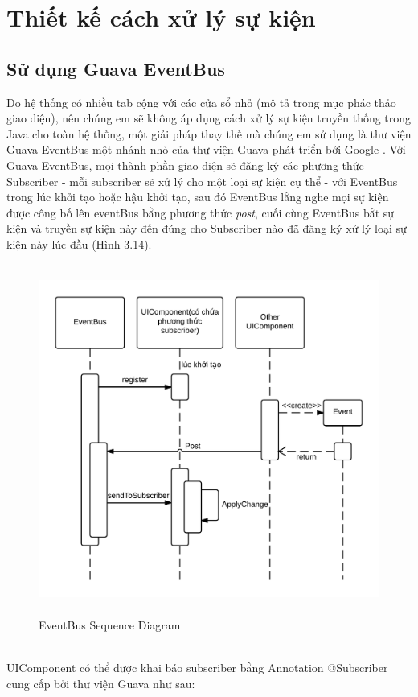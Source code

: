 {\section{Thiết kế cách xử lý sự kiện}
\subsection{Sử dụng Guava EventBus}
Do hệ thống có nhiều tab cộng với các cửa sổ nhỏ (mô tả trong mục phác thảo giao diện), nên chúng em sẽ không áp dụng cách xử lý sự kiện truyền thống trong Java cho toàn hệ thống, một giải pháp thay thế mà chúng em sử dụng là thư viện Guava EventBus một nhánh nhỏ của thư viện Guava phát triển bởi Google \cite{guava}. Với Guava EventBus, mọi thành phần giao diện sẽ đăng ký các phương thức Subscriber - mỗi subscriber sẽ xử lý cho một loại sự kiện cụ thể -  với EventBus trong lúc khởi tạo hoặc hậu khởi tạo, sau đó EventBus lắng nghe mọi sự kiện được công bố lên eventBus bằng phương thức \textit{post}, cuối cùng EventBus bắt sự kiện và truyền sự kiện này đến đúng cho Subscriber nào đã đăng ký xử lý loại sự kiện này lúc đầu (Hình 3.14).
\begin{figure}[h!]
	\centering
	\includegraphics[height=115mm]{Figures/uml_eventbus_sequence.png}
	\caption{EventBus Sequence Diagram \label{overflow}}
\end{figure}
\\
UIComponent có thể được khai báo subscriber bằng Annotation @Subscriber cung cấp bởi thư viện Guava như sau:
\begin{verbatim}

\end{verbatim}}
